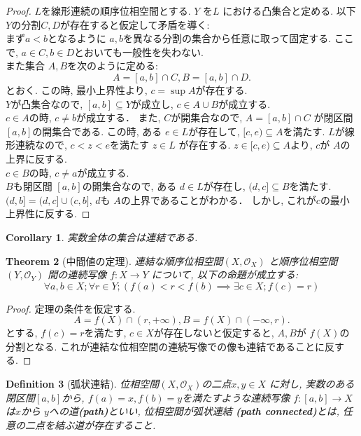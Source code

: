 \documentclass[lualatex]{ltjsbook}
\newtheorem{theorem}{Theorem}[section]
\newtheorem{corollary}[theorem]{Corollary}
\newtheorem{definition}[theorem]{Definition}
\theoremstyle{remark}
\theoremstyle{plain}
\begin{document}
\begin{proof}
	$L$を線形連続の順序位相空間とする. 
	$Y$ を$L$ における凸集合と定める. 
	以下$Y$の分割$C,D$が存在すると仮定して矛盾を導く:\\ 
	まず$a<b$となるように $a,b$を異なる分割の集合から任意に取って固定する. 
	ここで, $a \in C, b \in D$とおいても一般性を失わない.\\
	また集合 $A,B$を次のように定める:
	 \[
		 A=[a,b] \cap C, B= [a,b] \cap D
	.\] 
	とおく. この時, 最小上界性より, $c=\sup A$が存在する.\\
	$Y$が凸集合なので,  $[a,b] \subseteq Y$が成立し, $ c \in A \cup B$が成立する.\\
	$c\in A$の時,  $c \neq b$が成立する．
	また, $C$が開集合なので, $A=[a,b] \cap C$ が閉区間$[a,b]$の開集合である. 
	この時, ある $e \in L$が存在して,  $[c,e) \subseteq A$を満たす.
	$L$が線形連続なので,  $c<z<e$を満たす $z \in L$ が存在する. 
	$z \in [c,e) \subseteq A$より, $c$が $A$の上界に反する.\\
	 $c \in B$の時,  $c \neq a$が成立する. \\
	 $B$も閉区間 $[a,b]$の開集合なので, ある $d \in L$が存在し,  $(d,c] \subseteq B$を満たす.
	 $(d,b] = (d,c] \cup (c ,b]$, $d$も $A$の上界であることがわかる．
	 しかし, これが$c$の最小上界性に反する.
\end{proof}

\begin{corollary}
	実数全体の集合は連結である.
\end{corollary}

\begin{theorem}[中間値の定理]
	連結な順序位相空間$\left( X ,\mathcal{O}_X \right) $ と順序位相空間$ \left( Y, \mathcal{O}_Y \right) $ 間の連続写像
	$f: X \to Y$ について, 以下の命題が成立する: 
	$$
	\forall a,b \in X; \forall r \in Y; \left( f(a)<r< f(b) \implies \exists c \in X ;f(c) =r \right)
	$$
\end{theorem}

\begin{proof}
	定理の条件を仮定する. 
	\[
	A=f(X) \cap (r, + \infty), B= f(X) \cap (- \infty, r)
	.\]
	とする, $f(c) =r$を満たす,  $c \in X$が存在しないと仮定すると,  $A,B$が $f(X)$の分割となる. 
	これが連結な位相空間の連続写像での像も連結であることに反する.
\end{proof}

\begin{definition}[弧状連結]
	位相空間$ \left( X , \mathcal{O}_X \right) $の二点$x,y \in X$ に対し, 
	実数のある閉区間$[a,b]$から,  $f(a) =x,f(b) = y$を満たすような連続写像 
	$f: [a,b] \to X$は$x$から $y$への道\textbf{(path)}といい, 
	位相空間が弧状連結 \textbf{(path connected)}とは, 任意の二点を結ぶ道が存在すること.
\end{definition}
\end{document}

